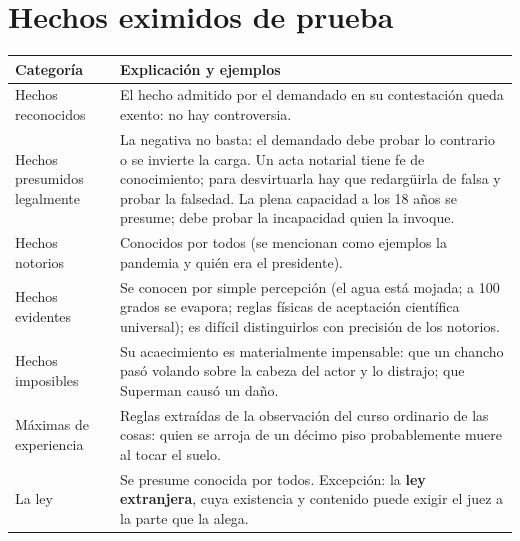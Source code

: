\documentclass[12pt,oneside]{book}
\renewcommand{\arraystretch}{1.15}
\begin{document}
\section{Hechos eximidos de prueba}

\begin{table}[H]
\centering
\renewcommand{\arraystretch}{1.25}
\begin{tabularx}{\textwidth}{>{\RaggedRight\arraybackslash}p{}>{\RaggedRight\arraybackslash}X}
\toprule
\textbf{Categoría} & \textbf{Explicación y ejemplos} \\
\midrule
Hechos reconocidos & El hecho admitido por el demandado en su contestación queda exento: no hay controversia. \\
\addlinespace
Hechos presumidos legalmente & La negativa no basta: el demandado debe probar lo contrario o se invierte la carga. Un acta notarial tiene fe de conocimiento; para desvirtuarla hay que redargüirla de falsa y probar la falsedad. La plena capacidad a los 18 años se presume; debe probar la incapacidad quien la invoque. \\
\addlinespace
Hechos notorios & Conocidos por todos (se mencionan como ejemplos la pandemia y quién era el presidente). \\
\addlinespace
Hechos evidentes & Se conocen por simple percepción (el agua está mojada; a 100 grados se evapora; reglas físicas de aceptación científica universal); es difícil distinguirlos con precisión de los notorios. \\
\addlinespace
Hechos imposibles & Su acaecimiento es materialmente impensable: que un chancho pasó volando sobre la cabeza del actor y lo distrajo; que Superman causó un daño. \\
\addlinespace
Máximas de experiencia & Reglas extraídas de la observación del curso ordinario de las cosas: quien se arroja de un décimo piso probablemente muere al tocar el suelo. \\
\addlinespace
La ley & Se presume conocida por todos. Excepción: la \textbf{ley extranjera}, cuya existencia y contenido puede exigir el juez a la parte que la alega. \\
\bottomrule
\end{tabularx}
\end{table}
\end{document}
